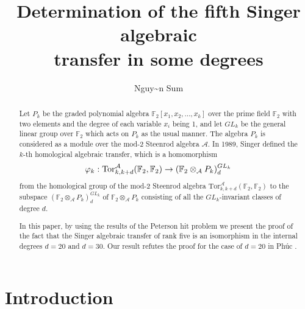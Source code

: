\documentclass[reqno]{amsart}
\theoremstyle{plain}
\theoremstyle{definition}
\theoremstyle{plain}
\theoremstyle{definition}
\numberwithin{equation}{section}
\begin{document}
\title[Determination of the fifth Singer transfer]
{Determination of the fifth Singer algebraic\\ transfer in some degrees}

\author{Nguy\~\ecircumflex n Sum}
\address{Department of Mathematics and Applications, S\`ai G\`on University, 273 An D\uhorn \ohorn ng V\uhorn \ohorn ng, District 5, H\`\ocircumflex\ Ch\'i Minh city, Viet Nam}




\begin{abstract}
Let $P_k$ be the graded polynomial algebra $\mathbb F_2[x_1,x_2,\ldots ,x_k]$ over the prime field $\mathbb F_2$ with two elements and the degree of each variable $x_i$ being 1, and let $GL_k$ be the general linear group over $\mathbb F_2$ which acts on $P_k$ as the usual manner. The algebra $P_k$ is considered as a module over the mod-2 Steenrod algebra $\mathcal A$.
In 1989, Singer \cite{si1} defined the $k$-th homological algebraic transfer, which is a homomorphism
$$\varphi_k :{\rm Tor}^{\mathcal A}_{k,k+d} (\mathbb F_2,\mathbb F_2) \to  (\mathbb F_2\otimes_{\mathcal A}P_k)_d^{GL_k}$$
from the homological group of the mod-2 Steenrod algebra $\mbox{Tor}^{\mathcal A}_{k,k+d} (\mathbb F_2,\mathbb F_2)$ to the subspace $(\mathbb F_2\otimes_{\mathcal A}P_k)_d^{GL_k}$ of $\mathbb F_2{\otimes}_{\mathcal A}P_k$ consisting of all the $GL_k$-invariant classes of degree $d$. 

In this paper, by using the results of the Peterson hit problem we present the proof of the fact that the Singer algebraic transfer of rank five is an isomorphism in the internal degrees $d= 20$ and $d = 30$. Our result refutes the proof for the case of $d=20$ in Ph\'uc \cite{p24}.
\end{abstract}

\maketitle

\section{Introduction}\label{s1} 
\setcounter{equation}{0}
\end{document}
